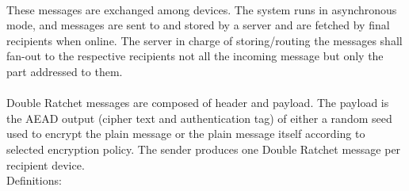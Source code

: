 \documentclass[a4paper,11pt]{article}
\begin{document}
    \paragraph*{}These messages are exchanged among devices. The system runs in asynchronous mode, and messages are sent to and stored by a server and are fetched by final recipients when online. The server in charge of storing/routing the messages shall fan-out to the respective recipients not all the incoming message but only the part addressed to them.

    \paragraph*{}Double Ratchet messages are composed of header and payload. The payload is the AEAD output (cipher text and authentication tag) of either a random seed used to encrypt the plain message or the plain message itself according to selected encryption policy. The sender produces one Double Ratchet message per recipient device.\\
      Definitions:
\end{document}
